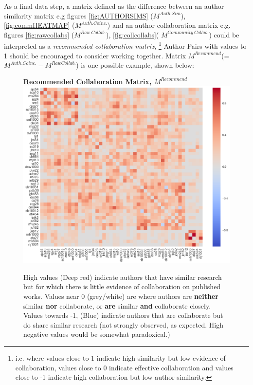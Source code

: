 As a final data step, a matrix defined as the difference between an author similarity matrix e.g figures \ref{fig:AUTHORSIMS} ($M^{Auth. Sim}$), \ref{fig:commHEATMAP} ($M^{Auth. Coinc.}$) and an author collaboration matrix e.g. figures \ref{fig:rawcollabs} ($M^{Raw\ Collab.}$), \ref{fig:collcollabs}( $M^{Community\ Collab.}$) could be interpreted as a \emph{recommended collaboration matrix}, \footnote{i.e. where values close to 1 indicate high similarity but low evidence of collaboration, values close to 0 indicate effective collaboration and values close to -1 indicate high collaboration but low author similarity.} Author Pairs with values to 1 should be encouraged to consider working together. Matrix $M^{Recommend}$(=$M^{Auth. Coinc.}-M^{Raw Collab.}$) is one possible example, shown below:
\begin{center}
\begin{figure}[H]
  \centering
  \textbf{Recommended Collaboration Matrix, $M^{Recommend}$}
    \includegraphics[width=\textwidth]{Analysis/Recommending_Mat.png}
    \caption[Recommended Collaboration Matrix]{High values (Deep red) indicate authors that have similar research but for which there is little evidence of collaboration on published works. Values near 0 (grey/white) are where authors are \textbf{neither} similar \textbf{nor} collaborate, or \textbf{are} similar \textbf{and} collaborate closely. Values towards -1, (Blue) indicate authors that are collaborate but do share similar research (not strongly observed, as expected. High negative values would be somewhat paradoxical.) }
    \label{fig:RECOMM_MAT}
\end{figure} 
\end{center}
